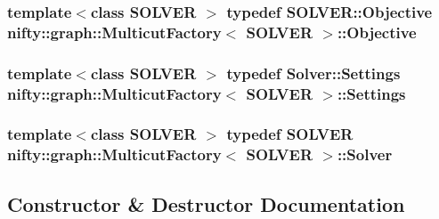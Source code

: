 \subsubsection[{Objective}]{\setlength{\rightskip}{0pt plus 5cm}template$<$class S\+O\+L\+V\+E\+R $>$ typedef S\+O\+L\+V\+E\+R\+::\+Objective {\bf nifty\+::graph\+::\+Multicut\+Factory}$<$ S\+O\+L\+V\+E\+R $>$\+::{\bf Objective}}\label{classnifty_1_1graph_1_1MulticutFactory_a631a3db484b95d061faced985d6f76fc}
\hypertarget{classnifty_1_1graph_1_1MulticutFactory_a79d62ed8a9b7af1024767db79ebbdabd}{}
\subsubsection[{Settings}]{\setlength{\rightskip}{0pt plus 5cm}template$<$class S\+O\+L\+V\+E\+R $>$ typedef Solver\+::\+Settings {\bf nifty\+::graph\+::\+Multicut\+Factory}$<$ S\+O\+L\+V\+E\+R $>$\+::{\bf Settings}}\label{classnifty_1_1graph_1_1MulticutFactory_a79d62ed8a9b7af1024767db79ebbdabd}
\hypertarget{classnifty_1_1graph_1_1MulticutFactory_a4be2c066de2cad53c0132d80762d1a86}{}
\subsubsection[{Solver}]{\setlength{\rightskip}{0pt plus 5cm}template$<$class S\+O\+L\+V\+E\+R $>$ typedef S\+O\+L\+V\+E\+R {\bf nifty\+::graph\+::\+Multicut\+Factory}$<$ S\+O\+L\+V\+E\+R $>$\+::{\bf Solver}}\label{classnifty_1_1graph_1_1MulticutFactory_a4be2c066de2cad53c0132d80762d1a86}


\subsection{Constructor \& Destructor Documentation}
\hypertarget{classnifty_1_1graph_1_1MulticutFactory_a080f784de6737af28b908645d8f35d8d}{}
